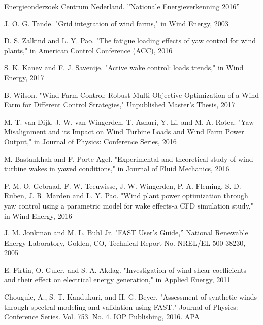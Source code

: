 \begin{thebibliography}{99} %

Energieonderzoek Centrum Nederland. ''Nationale Energieverkenning 2016''

J. O. G. Tande. "Grid integration of wind farms," in Wind Energy, 2003

 D. S. Zalkind and L. Y. Pao. "The fatigue loading effects of yaw control for wind plants," in American Control Conference (ACC), 2016

S. K. Kanev and F. J. Savenije. "Active wake control: loads trends," in Wind Energy, 2017

B. Wilson. "Wind Farm Control: Robust Multi-Objective Optimization of a Wind Farm for Different Control Strategies," Unpublished Master's Thesis, 2017

M. T. van Dijk, J. W. van Wingerden, T. Ashuri, Y. Li, and M. A. Rotea. "Yaw-Misalignment and its Impact on Wind Turbine Loads and Wind Farm Power Output," in Journal of Physics: Conference Series, 2016

M. Bastankhah and F. Porte-Agel. "Experimental and theoretical study of wind turbine wakes in yawed conditions," in Journal of Fluid Mechanics, 2016

P. M. O. Gebraad, F. W. Teeuwisse, J. W. Wingerden, P. A. Fleming, S. D. Ruben, J. R. Marden and L. Y. Pao. "Wind plant power optimization through yaw control using a parametric model for wake effects-a CFD simulation study," in Wind Energy, 2016

J. M. Jonkman and M. L. Buhl Jr. "FAST User's Guide,'' National Renewable Energy Laboratory, Golden, CO, Technical Report No. NREL/EL-500-38230, 2005

E. Firtin, O. Guler, and S. A. Akdag. "Investigation of wind shear coefficients and their effect on electrical energy generation," in Applied Energy, 2011

Chougule, A., S. T. Kandukuri, and H.-G. Beyer. "Assessment of synthetic winds through spectral modeling and validation using FAST." Journal of Physics: Conference Series. Vol. 753. No. 4. IOP Publishing, 2016.
APA	


\end{thebibliography}